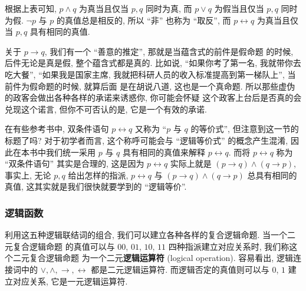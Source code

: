 \documentclass[10pt,UTF8]{book} %
\begin{document}
根据上表可知, $p \wedge q$ 为真当且仅当 $p,q$ 同时为真, 而 $p \vee q$ 为假当且仅当
$p,q$ 同时为假. $\lnot p$ 与 $p$ 的真值总是相反的, 所以 “非” 也称为 “取反”, 
而 $p \leftrightarrow q$ 为真当且仅当 $p,q$ 具有相同的真值.

关于 $p \rightarrow q$, 我们有一个 “善意的推定”, 那就是当蕴含式的前件是假命题
的时候, 后件无论是真是假, 整个蕴含式都是真的. 比如说, “如果你考了第一名, 我就带你去吃大餐”,
“如果我是国家主席, 我就把科研人员的收入标准提高到第一梯队上”, 当前件为假命题的时候, 就算后面
是在胡说八道, 这也是一个真命题. 所以那些虚伪的政客会做出各种各样的承诺来诱惑你, 你可能会怀疑
这个政客上台后是否真的会兑现这个诺言, 但你不可否认的是, 它是一个有效的承诺.

在有些参考书中, 双条件语句 $p \leftrightarrow q$ 又称为 “$p$ 与 $q$ 的等价式”,
但注意到这一节的标题了吗? 对于初学者而言, 这个称呼可能会与 “逻辑等价式” 的概念产生混淆,
因此在本书中我们统一采用 {\kaishu $p$ 与 $q$ 具有相同的真值}来解释 $p \leftrightarrow q$.
而将 $p \leftrightarrow q$ 称为 “双条件语句” 其实是合理的, 这是因为 $p \leftrightarrow q$
实际上就是 $(p \to q) \wedge (q \to p)$, 事实上, 无论 $p,q$ 给出怎样的指派,
$p \leftrightarrow q$ 与 $(p \to q) \wedge (q \to p)$ 总具有相同的真值,
这其实就是我们很快就要学到的 “逻辑等价”.

\subsubsection{逻辑函数}

利用这五种逻辑联结词的组合, 我们可以建立各种各样的复合逻辑命题. 当一个二元复合逻辑命题
的真值可以与 $00$, $01$, $10$, $11$ 四种指派建立对应关系时, 我们称这个二元复合逻辑命题
为一个二元\textbf{逻辑运算符} (logical operation).
容易看出, 逻辑连接词中的 $\vee, \wedge, \to, \leftrightarrow$ 都是二元逻辑运算符.
而逻辑否定的真值则可以与 $0$, $1$ 建立对应关系, 它是一元逻辑运算符.
\end{document}
